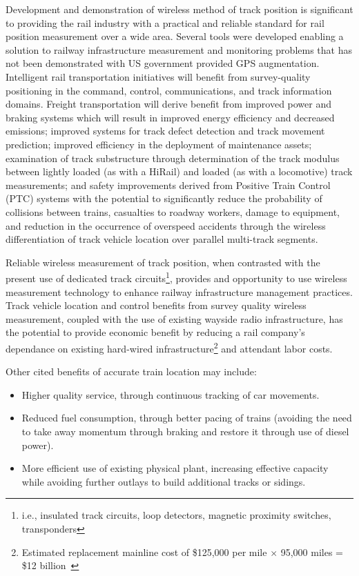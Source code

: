Development and demonstration of wireless method of track position is significant to providing the rail industry with a practical and reliable standard for rail position measurement over a wide area. Several tools were developed enabling a solution to railway infrastructure measurement and monitoring problems that has not been demonstrated with US government provided GPS augmentation. Intelligent rail transportation initiatives will benefit from survey-quality positioning in the command, control, communications, and track information domains. Freight transportation will derive benefit from  improved power and braking systems which will result in improved energy efficiency and decreased emissions; improved systems for track defect detection and track movement prediction; improved efficiency in the deployment of maintenance assets; examination of track substructure through determination of the track modulus between lightly loaded (as with a HiRail) and loaded (as with a locomotive) track measurements; and safety improvements derived from Positive Train Control (PTC) systems with the potential to significantly reduce the probability of collisions between trains, casualties to roadway workers, damage to equipment, and reduction in the occurrence of overspeed accidents through the wireless differentiation of track vehicle location over parallel multi-track segments.

Reliable wireless measurement of track position, when contrasted with the present use of dedicated track circuits\footnote{i.e., insulated track circuits, loop detectors, magnetic proximity switches, transponders}, provides and opportunity to use wireless measurement technology to enhance railway infrastructure management practices. Track vehicle location and control benefits from survey quality wireless measurement, coupled with the use of existing wayside radio infrastructure, has the potential to provide economic benefit by reducing a rail company's dependance on existing hard-wired infrastructure\footnote{Estimated replacement mainline cost of \$125,000 per mile $\times$ 95,000 miles = \$12 billion~\citep{ResorPTC}} and attendant labor costs.

Other cited benefits of accurate train location may include:
\begin{itemize}
\firmlist
	\item Higher quality service, through continuous tracking of car movements.
	\item Reduced fuel consumption, through better pacing of trains (avoiding the need to take away momentum through braking and restore it through use of diesel power).
	\item More efficient use of existing physical plant, increasing effective capacity while avoiding further outlays to build additional tracks or sidings.~\citep[pp.12-13]{1995FRADiffe}
\end{itemize}

